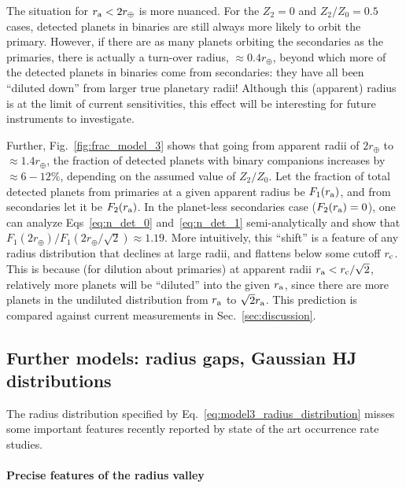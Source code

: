 \documentclass[12pt,modern]{aastex61}
\renewcommand{\a}{_{\rm a}}
\begin{document}
The situation for $r\a < 2r_\oplus$ is more nuanced.
For the $Z_2=0$ and $Z_2/Z_0=0.5$ cases, detected planets in binaries are 
still always more likely to orbit the primary.
However, if there are as many planets orbiting the secondaries as the 
primaries, there is actually a turn-over radius, $\approx 0.4r_\oplus$, 
beyond which more of the detected planets in binaries come from secondaries: 
they have all been ``diluted down'' from larger true planetary radii!
Although this (apparent) radius is at the limit of current sensitivities, this 
effect will be interesting for future instruments to investigate.

Further, Fig.~\ref{fig:frac_model_3} shows that going from apparent 
radii of $2r_\oplus$ to $\approx 1.4r_\oplus$, the fraction of detected 
planets with binary companions increases by $\approx 6-12\%$, depending on the 
assumed value of $Z_2/Z_0$.
Let the fraction of total detected planets from primaries at a given 
apparent radius be $F_1(r\a)$, and from secondaries let it be $F_2(r\a)$.
In the planet-less secondaries case ($F_2(r\a)=0$), one can 
analyze Eqs~\ref{eq:n_det_0} and~\ref{eq:n_det_1} semi-analytically and show 
that $F_1(2r_\oplus)/F_1(2r_\oplus/\sqrt{2}) \approx 1.19$.
More intuitively, this ``shift'' is a feature of any radius distribution that 
declines at large radii, and flattens below some cutoff $r_{\rm c}$.
This is because (for dilution about primaries)
at apparent radii $r\a < r_{\rm c}/\sqrt{2}$, relatively more planets will be 
``diluted'' into the given $r\a$, since there are more planets in 
the undiluted distribution from $r\a$ to $\sqrt{2}r\a$.
This prediction is compared against current measurements in 
Sec.~\ref{sec:discussion}.



\subsection{Further models: radius gaps, Gaussian HJ distributions}
\label{sec:further_models}

The radius distribution specified by Eq.~\ref{eq:model3_radius_distribution} 
misses some important features recently reported by state of the art 
occurrence rate studies.

\paragraph{Precise features of the radius valley}
\end{document}
